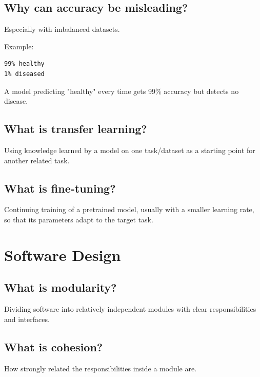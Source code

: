 \medskip

\subsection{Why can accuracy be misleading?}

Especially with imbalanced datasets.

Example:

\begin{lstlisting}
99% healthy
1% diseased
\end{lstlisting}

A model predicting "healthy" every time gets 99\% accuracy but detects no disease.

\medskip

\subsection{What is transfer learning?}

Using knowledge learned by a model on one task/dataset as a starting point for another related task.

\medskip

\subsection{What is fine-tuning?}

Continuing training of a pretrained model, usually with a smaller learning rate, so that its parameters adapt to the target task.

\medskip

\section{Software Design}

\subsection{What is modularity?}

Dividing software into relatively independent modules with clear responsibilities and interfaces.

\medskip

\subsection{What is cohesion?}

How strongly related the responsibilities inside a module are.


